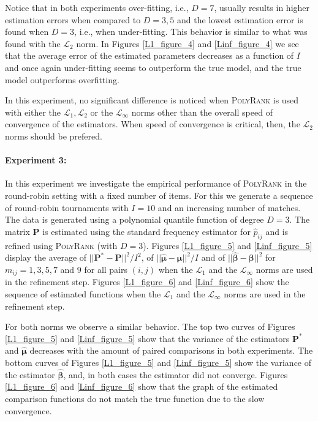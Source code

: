 \documentclass[twoside,11pt]{article}
\begin{document}
Notice that in both experiments over-fitting, i.e., $D=7$, usually results in higher estimation errors  when compared to $D=3,5$ and the lowest estimation error is found when $D=3$, i.e., when under-fitting. This behavior is similar to what was found with the $\mathcal{L}_2$ norm. In Figures \ref{L1_figure_4} and \ref{Linf_figure_4} we see that the average error of the estimated parameters decreases as a function of $I$ and once again under-fitting seems to outperform the true model, and the true model outperforms overfitting.

In this experiment, no significant difference is noticed when \textsc{PolyRank} is used with either the $\mathcal{L}_1,\mathcal{L}_2$ or the $\mathcal{L}_{\infty}$ norms other than the overall speed of convergence of the estimators. When speed of convergence is critical, then, the $\mathcal{L}_2$ norms should be prefered.

\paragraph{Experiment 3:} In this experiment we investigate the empirical performance of  \textsc{PolyRank} in the round-robin setting with a fixed number of items.  For this we generate a sequence of round-robin tournaments with $I=10$ and an increasing number of matches. The data is generated using a polynomial quantile function of degree $D=3$. The matrix $\boldsymbol{P}$ is estimated using the standard frequency estimator for $\hat{p}_{ij} $   and is refined using  \textsc{PolyRank} (with $D=3$). Figures \ref{L1_figure_5} and \ref{Linf_figure_5} display the average of $||\boldsymbol{P}^* - \boldsymbol{P}||^2/I^2$, of $||\boldsymbol{\hat \mu} - \boldsymbol{\mu}||^2/I$ and of $||\boldsymbol{\hat \beta} - \boldsymbol{\beta}||^2$ for $m_{ij}  = 1, 3, 5, 7$ and $9$ for all pairs $(i,j)$ when the $\mathcal{L}_1$ and the $\mathcal{L}_{\infty}$ norms are used in the refinement step. Figures \ref{L1_figure_6} and \ref{Linf_figure_6} show the sequence of estimated functions when the $\mathcal{L}_1$ and the $\mathcal{L}_{\infty}$ norms are used in the refinement step.

For both norms we observe a similar behavior. The top two curves of Figures \ref{L1_figure_5} and \ref{Linf_figure_5} show that the variance of the estimators $\boldsymbol{P}^*$ and  $\hat{\boldsymbol{\mu}}$ decreases with the amount of paired comparisons in both experiments. The bottom curves of Figures \ref{L1_figure_5} and \ref{Linf_figure_5} show the variance of the estimator $\hat{\boldsymbol{\beta}}$, and, in both cases the estimator did not converge. Figures \ref{L1_figure_6} and \ref{Linf_figure_6} show that the graph of the estimated comparison functions do not match the true function due to the slow convergence. 
\end{document}

